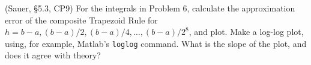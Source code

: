 \documentclass[12pt,fleqn]{exam}
\begin{document}
\begin{questions}

\question (Sauer, \S5.3, CP9) For the integrals in Problem 6, calculate the approximation error of the composite Trapezoid Rule for $h = b-a, (b-a)/2, (b-a)/4,\dots,(b-a)/2^8$, and plot. Make a log-log plot, using, for example, Matlab's \verb$loglog$ command. What is the slope of the plot, and does it agree with theory?

\end{questions}
\end{document}
